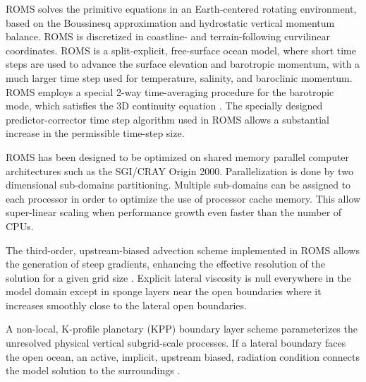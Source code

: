 ROMS solves the primitive equations in an Earth-centered
rotating environment, based on the Boussinesq approximation and
hydrostatic vertical momentum balance. ROMS is discretized in
coastline- and terrain-following curvilinear coordinates.
ROMS is a split-explicit, free-surface ocean model, where short time steps
are used to advance the surface elevation and barotropic momentum, with a
much larger time step used for temperature, salinity, and baroclinic momentum.
ROMS employs a special 2-way time-averaging procedure for the barotropic mode,
which satisfies the 3D continuity equation \citep{Shc03b}.
The specially designed predictor-corrector time step algorithm used in ROMS
allows a substantial increase in the permissible time-step size.

ROMS has been designed to be optimized on shared memory parallel computer
architectures such as the SGI/CRAY Origin 2000. Parallelization is done
by two dimensional sub-domains partitioning. Multiple sub-domains can be
assigned to each processor in order to optimize the use of processor
cache memory. This allow super-linear scaling when performance growth even
faster than the number of CPUs.

The third-order, upstream-biased advection scheme implemented in ROMS
allows the generation of steep gradients, enhancing the effective resolution
of the solution for a given grid size \citep{Shc98}. Explicit lateral
viscosity is null everywhere in the model domain except in sponge layers
near the open  boundaries where it increases smoothly close to the lateral
open boundaries.

A non-local, K-profile planetary (KPP) boundary layer scheme \citep{Lar94}
parameterizes the unresolved physical vertical subgrid-scale processes.
If a lateral boundary faces the open ocean, an active, implicit,
upstream biased, radiation condition connects the model solution
to the surroundings \citep{Mar01}.
